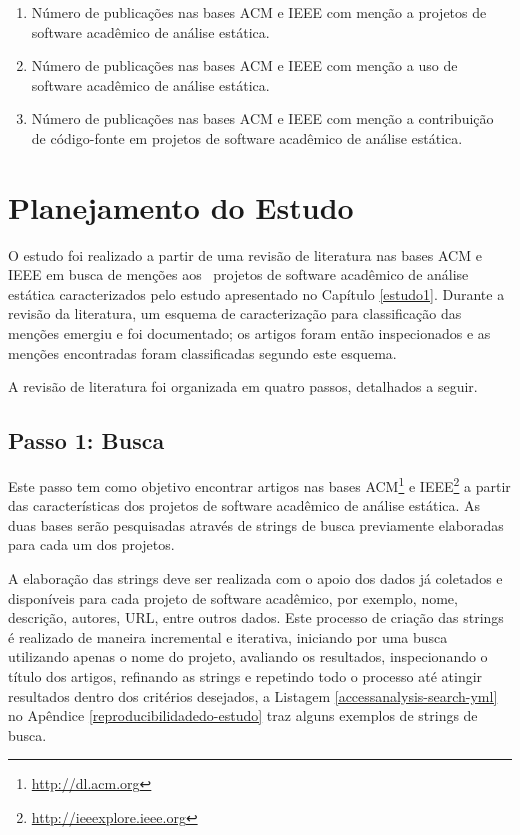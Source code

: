 \begin{enumerate}
  \item Número de publicações nas bases ACM e IEEE com menção a projetos de
    software acadêmico de análise estática.
  \item Número de publicações nas bases ACM e IEEE com menção a uso de
    software acadêmico de análise estática.
  \item Número de publicações nas bases ACM e IEEE com menção a contribuição de
    código-fonte em projetos de software acadêmico de análise estática.
\end{enumerate}


\section{Planejamento do Estudo} \label{estudo2:planejamento} %

O estudo foi realizado a partir de uma revisão de literatura nas bases ACM e
IEEE em busca de menções aos \SoftwareCount \ projetos de software acadêmico de
análise estática caracterizados pelo estudo apresentado no Capítulo \ref{estudo1}. 
Durante a revisão da literatura, 
um esquema de caracterização para classificação das menções emergiu e foi documentado;
os artigos foram então inspecionados e as menções encontradas foram classificadas segundo
este esquema.

A revisão de literatura foi organizada em quatro passos, detalhados a seguir.

\subsection{Passo 1: Busca}

Este passo tem como objetivo encontrar artigos nas bases
ACM\footnote{\url{http://dl.acm.org}} e
IEEE\footnote{\url{http://ieeexplore.ieee.org}} a partir das características
dos projetos de software acadêmico de análise estática.
As duas bases serão pesquisadas através de strings de busca previamente
elaboradas para cada um dos projetos.

A elaboração das strings deve ser realizada com o apoio dos dados já coletados
e disponíveis para cada projeto de software acadêmico, por exemplo, nome,
descrição, autores, URL, entre outros dados. Este processo de criação das
strings é realizado de maneira incremental e iterativa, iniciando por uma busca
utilizando apenas o nome do projeto, avaliando os resultados, inspecionando o
título dos artigos, refinando as strings e repetindo todo o processo até
atingir resultados dentro dos critérios desejados, a Listagem \ref{accessanalysis-search-yml}
no Apêndice \ref{reproducibilidadedo-estudo} traz alguns exemplos de strings de busca.

